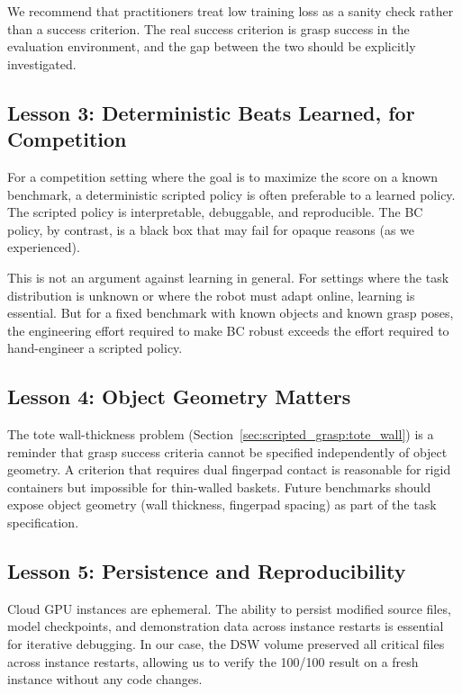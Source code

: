We recommend that practitioners treat low training loss as a sanity check rather than a success criterion. The real success criterion is grasp success in the evaluation environment, and the gap between the two should be explicitly investigated.

\subsection{Lesson 3: Deterministic Beats Learned, for Competition}
\label{sec:discussion:deterministic}

For a competition setting where the goal is to maximize the score on a known benchmark, a deterministic scripted policy is often preferable to a learned policy. The scripted policy is interpretable, debuggable, and reproducible. The BC policy, by contrast, is a black box that may fail for opaque reasons (as we experienced).

This is not an argument against learning in general. For settings where the task distribution is unknown or where the robot must adapt online, learning is essential. But for a fixed benchmark with known objects and known grasp poses, the engineering effort required to make BC robust exceeds the effort required to hand-engineer a scripted policy.

\subsection{Lesson 4: Object Geometry Matters}
\label{sec:discussion:geometry}

The tote wall-thickness problem (Section~\ref{sec:scripted_grasp:tote_wall}) is a reminder that grasp success criteria cannot be specified independently of object geometry. A criterion that requires dual fingerpad contact is reasonable for rigid containers but impossible for thin-walled baskets. Future benchmarks should expose object geometry (wall thickness, fingerpad spacing) as part of the task specification.

\subsection{Lesson 5: Persistence and Reproducibility}
\label{sec:discussion:persistence}

Cloud GPU instances are ephemeral. The ability to persist modified source files, model checkpoints, and demonstration data across instance restarts is essential for iterative debugging. In our case, the DSW  volume preserved all critical files across instance restarts, allowing us to verify the 100/100 result on a fresh instance without any code changes.

